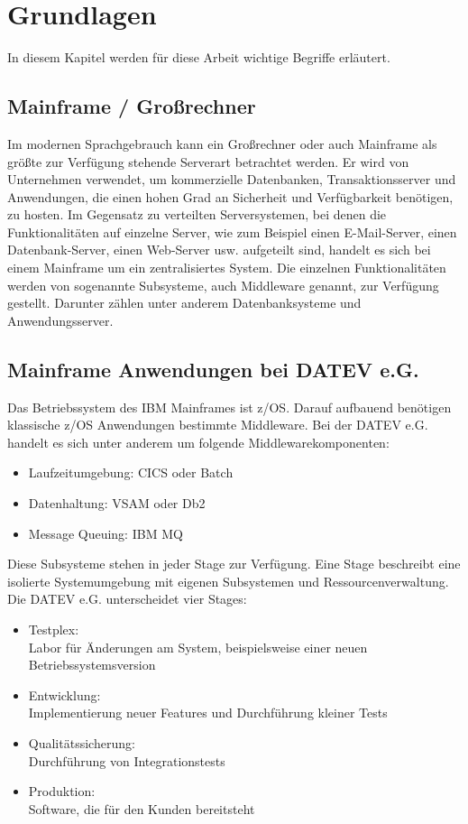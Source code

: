 \chapter{Grundlagen}\label{ch:grundlagen}
In diesem Kapitel werden für diese Arbeit wichtige Begriffe erläutert.

\section{Mainframe / Großrechner}\label{sec:mainframe}
Im modernen Sprachgebrauch kann ein Großrechner oder auch Mainframe als größte zur Verfügung stehende Serverart betrachtet werden.
Er wird von Unternehmen verwendet, um  kommerzielle Datenbanken, Transaktionsserver und Anwendungen, die einen hohen Grad an Sicherheit und Verfügbarkeit benötigen, zu hosten.
Im Gegensatz zu verteilten Serversystemen, bei denen die Funktionalitäten auf einzelne Server, wie zum Beispiel einen E-Mail-Server, einen Datenbank-Server, einen Web-Server usw. aufgeteilt sind, handelt es sich bei einem Mainframe um ein zentralisiertes System.
Die einzelnen Funktionalitäten werden von sogenannte \glqq Subsysteme\grqq, auch \glqq Middleware\grqq{} genannt, zur Verfügung gestellt.
Darunter zählen unter anderem Datenbanksysteme und Anwendungsserver.
\cite{Ebbers.2011}

\section{Mainframe Anwendungen bei DATEV e.G.}\label{sec:zosanw}
Das Betriebssystem des IBM Mainframes ist z/OS.
Darauf aufbauend benötigen klassische z/OS Anwendungen bestimmte Middleware.
Bei der DATEV e.G. handelt es sich unter anderem um folgende Middlewarekomponenten:

\begin{itemize}
\item Laufzeitumgebung: CICS oder Batch
\item Datenhaltung: VSAM oder Db2
\item Message Queuing: IBM MQ
\end{itemize}

Diese Subsysteme stehen in jeder Stage zur Verfügung.
Eine Stage beschreibt eine isolierte Systemumgebung mit eigenen Subsystemen und Ressourcenverwaltung.
Die DATEV e.G. unterscheidet vier Stages:
\begin{samepage}
\begin{itemize}
\item Testplex:\\
Labor für Änderungen am System, beispielsweise einer neuen Betriebssystemsversion
\item Entwicklung:\\
Implementierung neuer Features und Durchführung kleiner Tests
\item Qualitätssicherung:\\
Durchführung von Integrationstests
\item Produktion:\\
Software, die für den Kunden bereitsteht
\end{itemize}
\end{samepage}

